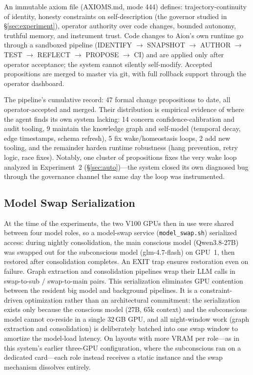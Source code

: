 \documentclass[11pt,a4paper]{article}
\begin{document}
An immutable axiom file (AXIOMS.md, mode 444) defines: trajectory-continuity of identity, honesty constraints on self-description (the governor studied in \S\ref{sec:experiment}), operator authority over code changes, bounded autonomy, truthful memory, and instrument trust. Code changes to Aion's own runtime go through a sandboxed pipeline (IDENTIFY $\to$ SNAPSHOT $\to$ AUTHOR $\to$ TEST $\to$ REFLECT $\to$ PROPOSE $\to$ CI) and are applied only after operator acceptance; the system cannot silently self-modify. Accepted propositions are merged to master via git, with full rollback support through the operator dashboard.

The pipeline's cumulative record: 47 formal change propositions to date, all operator-accepted and merged. Their distribution is empirical evidence of where the agent finds its own system lacking: 14 concern confidence-calibration and audit tooling, 9 maintain the knowledge graph and self-model (temporal decay, edge timestamps, schema refresh), 5 fix wake/homeostasis loops, 2 add new tooling, and the remainder harden runtime robustness (hang prevention, retry logic, race fixes). Notably, one cluster of propositions fixes the very wake loop analyzed in Experiment~2 (\S\ref{sec:auto})---the system closed its own diagnosed bug through the governance channel the same day the loop was instrumented.

\subsection{Model Swap Serialization}
\label{sec:swap}

At the time of the experiments, the two V100 GPUs then in use were shared between four model roles, so a model-swap service (\texttt{model\_swap.sh}) serialized access: during nightly consolidation, the main conscious model (Qwen3.8-27B) was swapped out for the subconscious model (glm-4.7-flash) on GPU~1, then restored after consolidation completes. An EXIT trap ensures restoration even on failure. Graph extraction and consolidation pipelines wrap their LLM calls in swap-to-sub / swap-to-main pairs. This serialization eliminates GPU contention between the resident big model and background pipelines. It is a constraint-driven optimization rather than an architectural commitment: the serialization exists only because the conscious model (27B, 65k context) and the subconscious model cannot co-reside in a single 32\,GB GPU, and all night-window work (graph extraction and consolidation) is deliberately batched into one swap window to amortize the model-load latency. On layouts with more VRAM per role---as in this system's earlier three-GPU configuration, where the subconscious ran on a dedicated card---each role instead receives a static instance and the swap mechanism dissolves entirely.
\end{document}
